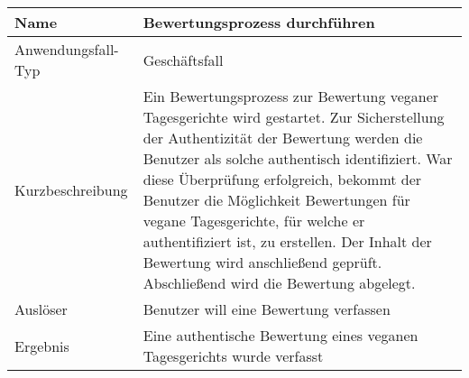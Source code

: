 \begin{table}[H]
    \centering
    \label{bewertungsprozessDurchfuehren}
    \begin{tabularx}{\textwidth}{| l | X |}
        \hline
        Name               & Bewertungsprozess durchführen                                                                                                                                                                                                                                                                                                                                                                                                                       \\
        \hline
        Anwendungsfall-Typ & Geschäftsfall                                                                                                                                                                                                                                                                                                                                                                                                                                       \\
        \hline
        Kurzbeschreibung   & Ein Bewertungsprozess zur Bewertung veganer Tagesgerichte wird gestartet. Zur Sicherstellung der Authentizität der Bewertung werden die Benutzer als solche authentisch identifiziert. War diese Überprüfung erfolgreich, bekommt der Benutzer die Möglichkeit Bewertungen für vegane Tagesgerichte, für welche er authentifiziert ist, zu erstellen. Der Inhalt der Bewertung wird anschließend geprüft. Abschließend wird die Bewertung abgelegt. \\
        \hline
        Auslöser           & Benutzer will eine Bewertung verfassen                                                                                                                                                                                                                                                                                                                                                                                                              \\
        \hline
        Ergebnis           & Eine authentische Bewertung eines veganen Tagesgerichts wurde verfasst                                                                                                                                                                                                                                                                                                                                                                              \\

\end{tabularx}
\end{table}
